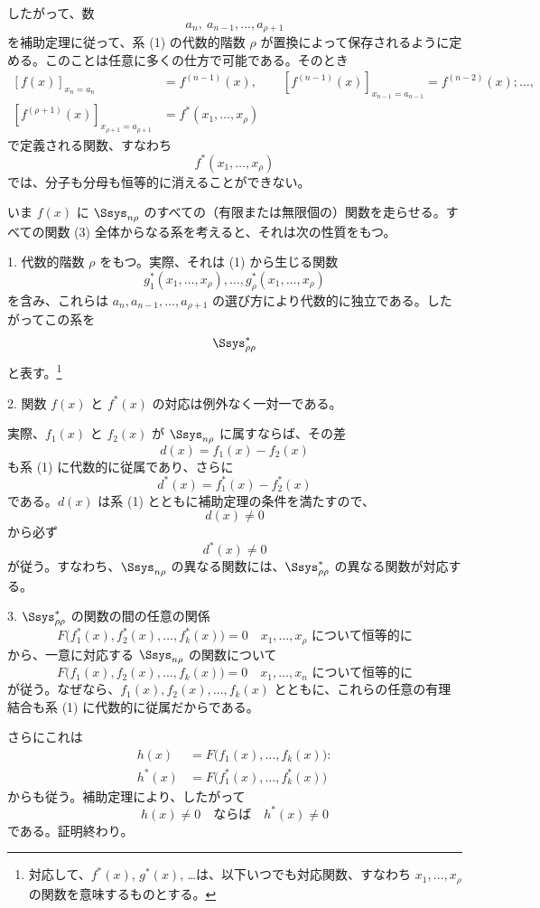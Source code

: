 \documentclass[11pt]{article}
\begin{document}
したがって、数
\[
  a_n,\ a_{n-1},\ldots,a_{\rho+1}
\]
を補助定理に従って、系 (1) の代数的階数 $\rho$ が置換によって保存されるように定める。このことは任意に多くの仕方で可能である。そのとき
\[
\begin{aligned}
 [f(x)]_{x_n=a_n}&=f^{(n-1)}(x),\qquad
 [f^{(n-1)}(x)]_{x_{n-1}=a_{n-1}}=f^{(n-2)}(x);\ldots,\\
 [f^{(\rho+1)}(x)]_{x_{\rho+1}=a_{\rho+1}}&=f^*(x_1,\ldots,x_\rho)
\end{aligned}
\]
で定義される関数、すなわち
\begin{equation}
  f^*(x_1,\ldots,x_\rho)
\tag{3}
\end{equation}
では、分子も分母も恒等的に消えることができない。

いま $f(x)$ に $\Ssys_{n\rho}$ のすべての（有限または無限個の）関数を走らせる。すべての関数 (3) 全体からなる系を考えると、それは次の性質をもつ。

1. 代数的階数 $\rho$ をもつ。実際、それは (1) から生じる関数
\[
  g_1^*(x_1,\ldots,x_\rho),\ldots,g_\rho^*(x_1,\ldots,x_\rho)
\]
を含み、これらは $a_n,a_{n-1},\ldots,a_{\rho+1}$ の選び方により代数的に独立である。したがってこの系を
\[
  \Ssys^*_{\rho\rho}
\]
と表す。\footnote{対応して、$f^*(x)$, $g^*(x)$, \ldots は、以下いつでも対応関数、すなわち $x_1,\ldots,x_\rho$ の関数を意味するものとする。}

2. 関数 $f(x)$ と $f^*(x)$ の対応は例外なく一対一である。

実際、$f_1(x)$ と $f_2(x)$ が $\Ssys_{n\rho}$ に属すならば、その差
\[
  d(x)=f_1(x)-f_2(x)
\]
も系 (1) に代数的に従属であり、さらに
\[
  d^*(x)=f_1^*(x)-f_2^*(x)
\]
である。$d(x)$ は系 (1) とともに補助定理の条件を満たすので、
\[
  d(x)\ne0
\]
から必ず
\[
  d^*(x)\ne0
\]
が従う。すなわち、$\Ssys_{n\rho}$ の異なる関数には、$\Ssys^*_{\rho\rho}$ の異なる関数が対応する。

3. $\Ssys^*_{\rho\rho}$ の関数の間の任意の関係
\[
  F\bigl(f_1^*(x),f_2^*(x),\ldots,f_k^*(x)\bigr)=0
  \quad\text{$x_1,\ldots,x_\rho$ について恒等的に}
\]
から、一意に対応する $\Ssys_{n\rho}$ の関数について
\[
  F\bigl(f_1(x),f_2(x),\ldots,f_k(x)\bigr)=0
  \quad\text{$x_1,\ldots,x_n$ について恒等的に}
\]
が従う。なぜなら、$f_1(x),f_2(x),\ldots,f_k(x)$ とともに、これらの任意の有理結合も系 (1) に代数的に従属だからである。

さらにこれは
\begin{equation}
\begin{aligned}
 h(x)&=F\bigl(f_1(x),\ldots,f_k(x)\bigr):\\
 h^*(x)&=F\bigl(f_1^*(x),\ldots,f_k^*(x)\bigr)
\end{aligned}
\tag{4}
\end{equation}
からも従う。補助定理により、したがって
\[
  h(x)\ne0\quad\text{ならば}\quad h^*(x)\ne0
\]
である。証明終わり。
\end{document}

